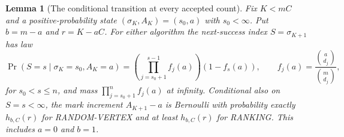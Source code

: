 \documentclass[11pt]{article}
\newtheorem{lemma}[theorem]{Lemma}
\begin{document}
\begin{lemma}[The conditional transition at every accepted count]
\label{lem:allhistory}
Fix $K<mC$ and a positive-probability state
$(\sigma_K,A_K)=(s_0,a)$ with $s_0<\infty$.
Put $b=m-a$ and $r=K-aC$.
For either algorithm the next-success index $S=\sigma_{K+1}$ has law
\begin{equation}\label{eq:waitingkernel}
 \Pr(S=s\mid\sigma_K=s_0,A_K=a)=
 \left(\prod_{j=s_0+1}^{s-1} f_j(a)\right)(1-f_s(a)),
 \qquad f_j(a)=\frac{\binom a{d_j}}{\binom m{d_j}},
\end{equation}
for $s_0<s\leq n$, and mass
$\prod_{j=s_0+1}^n f_j(a)$ at infinity.
Conditional also on $S=s<\infty$, the mark increment
$A_{K+1}-a$ is Bernoulli with probability exactly $h_{b,C}(r)$
for RANDOM-VERTEX and at least $h_{b,C}(r)$ for RANKING.
This includes $a=0$ and $b=1$.
\end{lemma}
\end{document}
